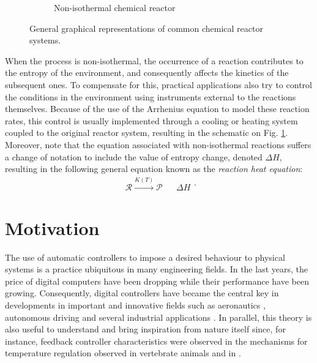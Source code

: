 \documentclass[a4paper,11pt]{book}
\numberwithin{figure}{chapter}
\numberwithin{equation}{chapter}
\numberwithin{table}{chapter}
\theoremstyle{definition}
\begin{document}
\begin{figure}
\begin{subfigure}{0.49\textwidth}
{}
	
	\caption{Non-isothermal chemical reactor}
	\label{fig:intro03b}
	\end{subfigure}	
	
	\caption{General graphical representations of common chemical reactor systems.}
	\label{fig:intro03}
\end{figure}

When the process is non-isothermal, the occurrence of a reaction contributes to the entropy of the environment, and consequently affects the kinetics of the subsequent ones. To compensate for this, practical applications also try to control the conditions in the environment using instruments external to the reactions themselves. Because of the use of the Arrhenius equation to model these reaction rates, this control is usually implemented through a cooling or heating system coupled to the original reactor system, resulting in the schematic on Fig. \ref{fig:intro03b}. Moreover, note that the equation associated with non-isothermal reactions suffers a change of notation to include the value of entropy change, denoted $\Delta H$, resulting in the following general equation known as the \textit{reaction heat equation}:
\begin{equation}
\begin{matrix}    
	\mathcal{R} \overset{K(T)}{\longrightarrow} \mathcal{P} & & \Delta H
\end{matrix}
.\end{equation} 

\section{Motivation}

The use of automatic controllers to impose a desired behaviour to physical systems is a practice ubiquitous in many engineering fields. In the last years, the price of digital computers have been dropping while their performance have been growing. Consequently, digital controllers have became the central key in developments in important and innovative fields such as aeronautics \cite{Eren:2017, Goerzen:2009, Wang:2015}, autonomous driving \cite{Gonzalez:2016, Falcone:2007, Cairano:2014} and several industrial applications \cite{JoeQin:2003, Tang:2016, Holenda:2008, Lucia:2013}. In parallel, this theory is also useful to understand and bring inspiration from nature itself since, for instance, feedback controller characteristics were observed in the mechanisms for temperature regulation observed in vertebrate animals \cite{Heller:1978} and in \cite{Todorov:2002}.
\end{document}
